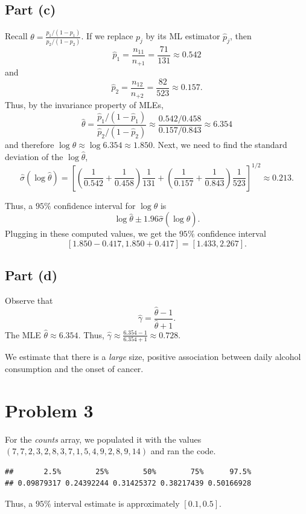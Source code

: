 \documentclass[
]{article}
\begin{document}
\hypertarget{part-c}{%
\subsection{Part (c)}\label{part-c}}


Recall \(\theta = \frac{p_1 / (1 - p_1)}{p_2 / (1 - p_2)}\). If we
replace \(p_j\) by its ML estimator \(\hat p_j\), then \[
  \hat p_1 = \frac{n_{1 1}}{n_{+1}} = \frac{71}{131} \approx 0.542
\] and \[
  \hat p_2 = \frac{n_{1 2}}{n_{+2}} = \frac{82}{523} \approx 0.157.
\] Thus, by the invariance property of MLEs, \[
  \hat\theta = \frac{\hat p_1 / (1 - \hat p_1)}{\hat p_2 / (1 - \hat p_2)} \approx \frac{0.542 / 0.458}{0.157 / 0.843} \approx 6.354
\] and therefore \(\log \theta \approx \log 6.354 \approx 1.850\). Next,
we need to find the standard deviation of the \(\log \hat\theta\), \[
  \hat\sigma(\log \hat\theta) = \left[
    \left(\frac{1}{0.542} + \frac{1}{0.458}\right)\frac{1}{131} +
    \left(\frac{1}{0.157} + \frac{1}{0.843}\right)\frac{1}{523}
    \right]^{1/2} \approx 0.213.
\]

Thus, a \(95\%\) confidence interval for \(\log \theta\) is \[
  \log \hat \theta \pm 1.96 \hat\sigma(\log \hat \theta).
\] Plugging in these computed values, we get the \(95\%\) confidence
interval \[
  [1.850 - 0.417,1.850 + 0.417] = [1.433,2.267].
\]

\hypertarget{part-d}{%
\subsection{Part (d)}\label{part-d}}


Observe that \[
  \hat\gamma = \frac{\hat\theta-1}{\hat\theta+1}.
\] The MLE \(\hat\theta \approx 6.354\). Thus,
\(\hat\gamma \approx \frac{6.354-1}{6.354+1} \approx 0.728\).

We estimate that there is a \emph{large} size, positive association
between daily alcohol consumption and the onset of cancer.

\hypertarget{problem-3}{%
\section{Problem 3}\label{problem-3}}

For the \emph{counts} array, we populated it with the values
\((7,7,2,3,2,8,3,7,1,5,4,9,2,8,9,14)\) and ran the code.

\begin{verbatim}
##       2.5%        25%        50%        75%      97.5% 
## 0.09879317 0.24392244 0.31425372 0.38217439 0.50166928
\end{verbatim}

Thus, a \(95\%\) interval estimate is approximately \([0.1,0.5]\).
\end{document}
